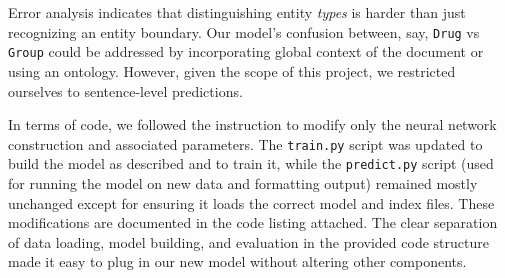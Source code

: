 Error analysis indicates that distinguishing entity \emph{types} is harder than just recognizing an entity boundary. Our model's confusion between, say, \texttt{Drug} vs \texttt{Group} could be addressed by incorporating global context of the document or using an ontology. However, given the scope of this project, we restricted ourselves to sentence-level predictions.

In terms of code, we followed the instruction to modify only the neural network construction and associated parameters. The \texttt{train.py} script was updated to build the model as described and to train it, while the \texttt{predict.py} script (used for running the model on new data and formatting output) remained mostly unchanged except for ensuring it loads the correct model and index files. These modifications are documented in the code listing attached. The clear separation of data loading, model building, and evaluation in the provided code structure made it easy to plug in our new model without altering other components. 